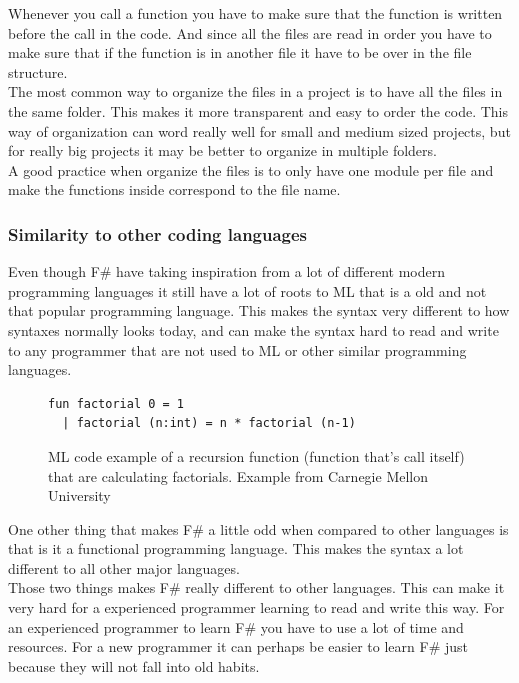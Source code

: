 \documentclass[12pt, a4paper]{article}
\begin{document}
Whenever you call a function you have to make sure that the function is written before the call in the code. And since all the files are read in order you have to make sure that if the function is in another file it have to be over in the file structure.\\

The most common way to organize the files in a project is to have all the files in the same folder. This makes it more transparent and easy to order the code. This way of organization can word really well for small and medium sized projects, but for really big projects it may be better to organize in multiple folders.\\

A good practice when organize the files is to only have one module per file and make the functions inside correspond to the file name.\\

\newpage
\subsubsection{Similarity to other coding languages}

Even though F\# have taking inspiration from a lot of different modern programming languages it still have a lot of roots to ML that is a old and not that popular programming language. This makes the syntax very different to how syntaxes normally looks today, and can make the syntax hard to read and write to any programmer that are not used to ML or other similar programming languages.\\

\begin{figure}[!h]
	\begin{lstlisting}
fun factorial 0 = 1
  | factorial (n:int) = n * factorial (n-1)
	\end{lstlisting}
	\caption{ML code example of a recursion function (function that's call itself) that are calculating factorials. Example from Carnegie Mellon University\cite{carnegieMellon}}
	\label{fig:factorialMLExample}
\end{figure}

One other thing that makes F\# a little odd when compared to other languages is that is it a functional programming language. This makes the syntax a lot different to all other major languages.\\

Those two things makes F\# really different to other languages. This can make it very hard for a experienced programmer learning to read and write this way. For an experienced programmer to learn F\# you have to use a lot of time and resources. For a new programmer it can perhaps be easier to learn F\# just because they will not fall into old habits.
\end{document}
